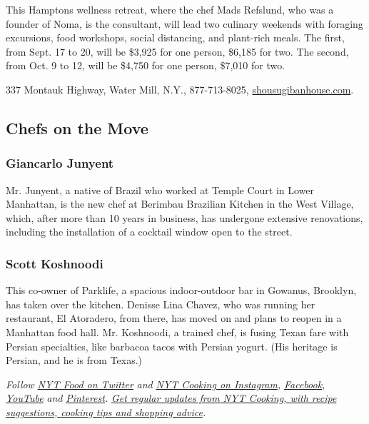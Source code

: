 This Hamptons wellness retreat, where the chef Mads Refslund, who was a
founder of Noma, is the consultant, will lead two culinary weekends with
foraging excursions, food workshops, social distancing, and plant-rich
meals. The first, from Sept. 17 to 20, will be \$3,925 for one person,
\$6,185 for two. The second, from Oct. 9 to 12, will be \$4,750 for one
person, \$7,010 for two.

337 Montauk Highway, Water Mill, N.Y., 877-713-8025,
\href{https://shousugibanhouse.com/}{shousugibanhouse.com}.

\hypertarget{chefs-on-the-move}{%
\subsection{Chefs on the Move}\label{chefs-on-the-move}}

\hypertarget{giancarlo-junyent-}{%
\subsubsection{Giancarlo Junyent }\label{giancarlo-junyent-}}

Mr. Junyent, a native of Brazil who worked at Temple Court in Lower
Manhattan, is the new chef at Berimbau Brazilian Kitchen in the West
Village, which, after more than 10 years in business, has undergone
extensive renovations, including the installation of a cocktail window
open to the street.

\hypertarget{scott-koshnoodi-}{%
\subsubsection{Scott Koshnoodi }\label{scott-koshnoodi-}}

This co-owner of Parklife, a spacious indoor-outdoor bar in Gowanus,
Brooklyn, has taken over the kitchen. Denisse Lina Chavez, who was
running her restaurant, El Atoradero, from there, has moved on and plans
to reopen in a Manhattan food hall. Mr. Koshnoodi, a trained chef, is
fusing Texan fare with Persian specialties, like barbacoa tacos with
Persian yogurt. (His heritage is Persian, and he is from Texas.)

\emph{Follow} \href{https://twitter.com/nytfood}{\emph{NYT Food on
Twitter}} \emph{and}
\href{https://www.instagram.com/nytcooking/}{\emph{NYT Cooking on
Instagram}}\emph{,}
\href{https://www.facebookcorewwwi.onion/nytcooking/}{\emph{Facebook}}\emph{,}
\href{https://www.youtube.com/nytcooking}{\emph{YouTube}} \emph{and}
\href{https://www.pinterest.com/nytcooking/}{\emph{Pinterest}}\emph{.}
\href{https://www.nytimes3xbfgragh.onion/newsletters/cooking}{\emph{Get
regular updates from NYT Cooking, with recipe suggestions, cooking tips
and shopping advice}}\emph{.}

